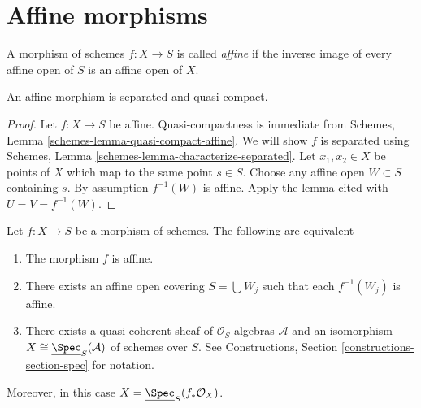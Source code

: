 \section{Affine morphisms}
\label{section-affine}

\begin{definition}
\label{definition-affine}
A morphism of schemes $f : X \to S$ is called {\it affine} if
the inverse image of every affine open of $S$ is an affine
open of $X$.
\end{definition}

\begin{lemma}
\label{lemma-affine-separated}
An affine morphism is separated and quasi-compact.
\end{lemma}

\begin{proof}
Let $f : X \to S$ be affine. Quasi-compactness is immediate from
Schemes, Lemma \ref{schemes-lemma-quasi-compact-affine}.
We will show $f$ is separated using
Schemes, Lemma \ref{schemes-lemma-characterize-separated}. Let
$x_1, x_2 \in X$ be points of $X$ which map to the same point $s \in S$.
Choose any affine open $W \subset S$ containing $s$. By assumption
$f^{-1}(W)$ is affine. Apply the lemma cited with $U = V = f^{-1}(W)$.
\end{proof}

\begin{lemma}
\label{lemma-characterize-affine}
\begin{reference}
\cite[II, Corollary 1.3.2]{EGA}
\end{reference}
Let $f : X \to S$ be a morphism of schemes.
The following are equivalent
\begin{enumerate}
\item The morphism $f$ is affine.
\item There exists an affine open covering $S = \bigcup W_j$
such that each $f^{-1}(W_j)$ is affine.
\item There exists a quasi-coherent sheaf of $\mathcal{O}_S$-algebras
$\mathcal{A}$ and an isomorphism
$X \cong \underline{\Spec}_S(\mathcal{A})$
of schemes over $S$. See
Constructions, Section \ref{constructions-section-spec} for notation.
\end{enumerate}
Moreover, in this case $X = \underline{\Spec}_S(f_*\mathcal{O}_X)$.
\end{lemma}

